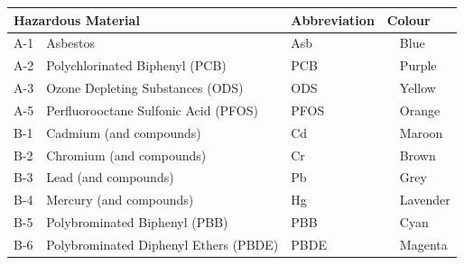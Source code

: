 \documentclass{article}
\begin{document}
\renewcommand{\arraystretch}{1.4}
\begin{center}
\begin{table}[H]
\begin{tabular}{|ll|l|ll|}
\hline
\multicolumn{2}{|l|}{\textbf{Hazardous Material}}          & \textbf{Abbreviation} & \multicolumn{2}{l|}{\textbf{Colour}}                   \\ \hline
\multicolumn{1}{|l|}{A-1} & Asbestos                       & Asb                   & \multicolumn{1}{l|}{\cellcolor[HTML]{3531FF}} & Blue   \\ \hline
\multicolumn{1}{|l|}{A-2} & Polychlorinated Biphenyl (PCB) & PCB                   & \multicolumn{1}{l|}{\cellcolor[HTML]{6200C9}} & Purple \\ \hline
\multicolumn{1}{|l|}{A-3}    &  Ozone Depleting Substances (ODS)                               &         ODS   &           \multicolumn{1}{l|}{\cellcolor[HTML]{EBF909}} & Yellow      \\ \hline
\multicolumn{1}{|l|}{A-5 }    &  Perfluorooctane Sulfonic Acid (PFOS)                               &         PFOS    &           \multicolumn{1}{l|}{\cellcolor[HTML]{F9BA09}} & Orange      \\ \hline
\multicolumn{1}{|l|}{B-1 }    &  Cadmium (and compounds)                               &         Cd    &           \multicolumn{1}{l|}{\cellcolor[HTML]{900C3F}} & Maroon      \\ \hline
\multicolumn{1}{|l|}{B-2 }    &  Chromium (and compounds)                                &         Cr    &           \multicolumn{1}{l|}{\cellcolor[HTML]{9F4C26}} & Brown      \\ \hline
\multicolumn{1}{|l|}{B-3 }    &  Lead (and compounds)                                &         Pb    &           \multicolumn{1}{l|}{\cellcolor[HTML]{908D8C}} & Grey      \\ \hline
\multicolumn{1}{|l|}{B-4 }    &  Mercury (and compounds)                                &         Hg    &           \multicolumn{1}{l|}{\cellcolor[HTML]{A778E9}} & Lavender      \\ \hline
\multicolumn{1}{|l|}{B-5}    &  Polybrominated Biphenyl (PBB)                                &         PBB    &           \multicolumn{1}{l|}{\cellcolor[HTML]{18B0F5}} & Cyan      \\ \hline
\multicolumn{1}{|l|}{B-6 }    &  Polybrominated Diphenyl Ethers (PBDE)                                 &         PBDE    &           \multicolumn{1}{l|}{\cellcolor[HTML]{F518C7}} & Magenta      \\ \hline

\end{tabular}
\end{table}
\end{center}
\end{document}
